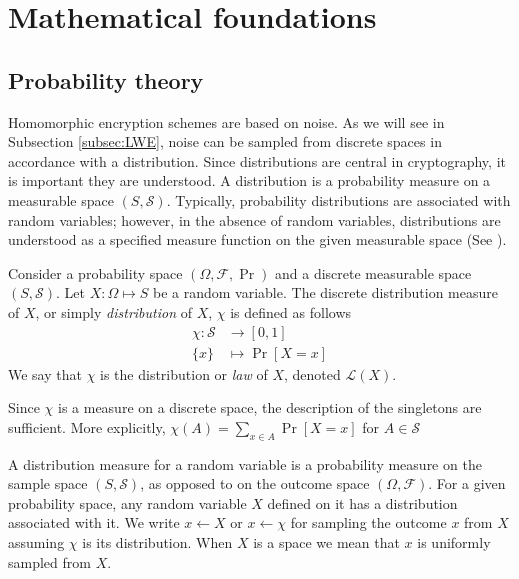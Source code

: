\chapter{Mathematical foundations}

\section{Probability theory}
Homomorphic encryption schemes are based on noise. As we will see in Subsection \ref{subsec:LWE}, noise can be sampled from discrete spaces in accordance with a distribution. Since distributions are central in cryptography, it is important they are understood. A distribution is a probability measure on a measurable space $(S, \mathcal{S})$. Typically, probability distributions are associated with random variables; however, in the absence of random variables, distributions are understood as a specified measure function on the given measurable space (See \cite[pp. 83]{kallenberg-probability}).
\begin{definition}
Consider a probability space $(\Omega, \mathcal{F}, \operatorname{Pr})$ and a discrete measurable space $(S,\mathcal{S})$. Let $X \colon \Omega \mapsto S$ be a random variable. The discrete distribution measure of $X$, or simply \emph{distribution} of $X$, $\chi$ is defined as follows
\begin{equation*}
\begin{aligned}
    \chi \colon \mathcal{S} &\to [0,1]\\
    \{x\} &\mapsto \operatorname{Pr}[X = x]
\end{aligned}
\end{equation*}
We say that $\chi$ is the distribution or \emph{law} of $X$, denoted $\mathcal{L}(X)$. 
\end{definition}
\begin{remark}
    Since $\chi$ is a measure on a discrete space, the description of the singletons are sufficient. More explicitly, $\chi(A) = \sum_{x \in A} \operatorname{Pr}[X = x]$ for $A \in \mathcal{S}$
\end{remark}
A distribution measure for a random variable is a probability measure on the sample space $(S,\mathcal{S})$, as opposed to on the outcome space $(\Omega, \mathcal{F})$. For a given probability space, any random variable $X$ defined on it has a distribution associated with it. We write $x \leftarrow X$ or $x \leftarrow \chi$ for sampling the outcome $x$ from $X$ assuming $\chi$ is its distribution. When $X$ is a space we mean that $x$ is uniformly sampled from $X$.

